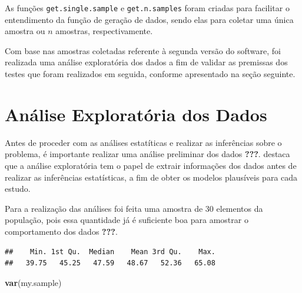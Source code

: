 \documentclass[]{article}
\newenvironment{Shaded}{\begin{snugshade}}{\end{snugshade}}
\newcommand{\ControlFlowTok}[1]{\textcolor[rgb]{0.13,0.29,0.53}{\textbf{#1}}}
\newcommand{\DataTypeTok}[1]{\textcolor[rgb]{0.13,0.29,0.53}{#1}}
\newcommand{\DecValTok}[1]{\textcolor[rgb]{0.00,0.00,0.81}{#1}}
\newcommand{\KeywordTok}[1]{\textcolor[rgb]{0.13,0.29,0.53}{\textbf{#1}}}
\newcommand{\NormalTok}[1]{#1}
\newcommand{\OperatorTok}[1]{\textcolor[rgb]{0.81,0.36,0.00}{\textbf{#1}}}
\newcommand{\StringTok}[1]{\textcolor[rgb]{0.31,0.60,0.02}{#1}}
\begin{document}
As funções \texttt{get.single.sample} e \texttt{get.n.samples} foram
criadas para facilitar o entendimento da função de geração de dados,
sendo elas para coletar uma única amostra ou \(n\) amostras,
respectivamente.

Com base nas amostras coletadas referente à segunda versão do software,
foi realizada uma análise exploratória dos dados a fim de validar as
premissas dos testes que foram realizados em seguida, conforme
apresentado na seção seguinte.

\hypertarget{analise-exploratoria-dos-dados}{%
\section{Análise Exploratória dos
Dados}\label{analise-exploratoria-dos-dados}}

Antes de proceder com as análises estatíticas e realizar as inferências
sobre o problema, é importante realizar uma análise preliminar dos dados
{\textbf{???}}. destaca que a análise exploratória tem o papel de
extrair informações dos dados antes de realizar as inferências
estatísticas, a fim de obter os modelos plausíveis para cada estudo.

Para a realização das análises foi feita uma amostra de 30 elementos da
população, pois essa quantidade já é suficiente boa para amostrar o
comportamento dos dados {\textbf{???}}.

\begin{Shaded}
\end{Shaded}

\begin{verbatim}
##    Min. 1st Qu.  Median    Mean 3rd Qu.    Max. 
##   39.75   45.25   47.59   48.67   52.36   65.08
\end{verbatim}

\begin{Shaded}
\begin{Highlighting}[]
\KeywordTok{var}\NormalTok{(my.sample)}
\end{Highlighting}
\end{Shaded}
\end{document}
